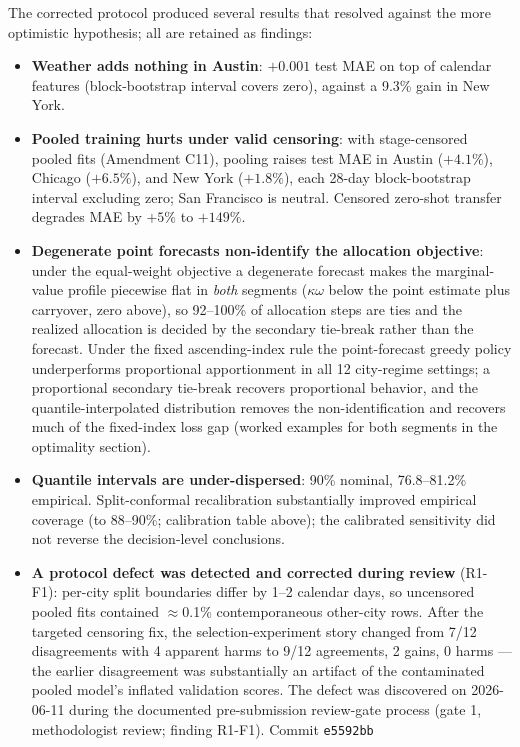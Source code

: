The corrected protocol produced several results that resolved against the
more optimistic hypothesis; all are retained as findings:
\begin{itemize}
\item \textbf{Weather adds nothing in Austin}: $+0.001$ test MAE on top
of calendar features (block-bootstrap interval covers zero), against a
9.3\% gain in New York.
\item \textbf{Pooled training hurts under valid censoring}: with
stage-censored pooled fits (Amendment C11), pooling raises test MAE
in Austin ($+4.1\%$), Chicago ($+6.5\%$), and New York ($+1.8\%$), each
28-day block-bootstrap interval excluding zero; San Francisco is neutral.
Censored zero-shot transfer degrades MAE by $+5\%$ to $+149\%$.
\item \textbf{Degenerate point forecasts non-identify the allocation
objective}: under the equal-weight objective a degenerate forecast makes the
marginal-value profile piecewise flat in \emph{both} segments
($\kappa\omega$ below the point estimate plus carryover, zero above), so
92--100\% of allocation steps are ties and the realized allocation is
decided by the secondary tie-break rather than the forecast. Under the
fixed ascending-index rule the point-forecast greedy policy underperforms
proportional apportionment in all 12 city-regime settings; a proportional
secondary tie-break recovers proportional behavior, and the
quantile-interpolated distribution removes the non-identification and
recovers much of the fixed-index loss gap (worked examples for both
segments in the optimality section).
\item \textbf{Quantile intervals are under-dispersed}: 90\% nominal,
76.8--81.2\% empirical. Split-conformal recalibration substantially
improved empirical coverage (to 88--90\%; calibration table above); the
calibrated sensitivity did not reverse the decision-level conclusions.
\item \textbf{A protocol defect was detected and corrected during review}
(R1-F1): per-city split boundaries differ by 1--2 calendar days, so
uncensored pooled fits contained $\approx$0.1\% contemporaneous
other-city rows. After the targeted censoring fix, the
selection-experiment story changed from 7/12 disagreements with 4
apparent harms to 9/12 agreements, 2 gains, 0 harms --- the earlier
disagreement was substantially an artifact of the contaminated pooled
model's inflated validation scores. The defect was discovered on
2026-06-11 during the documented pre-submission review-gate process
(gate 1, methodologist review; finding R1-F1). Commit \texttt{e5592bb}

\end{itemize}
